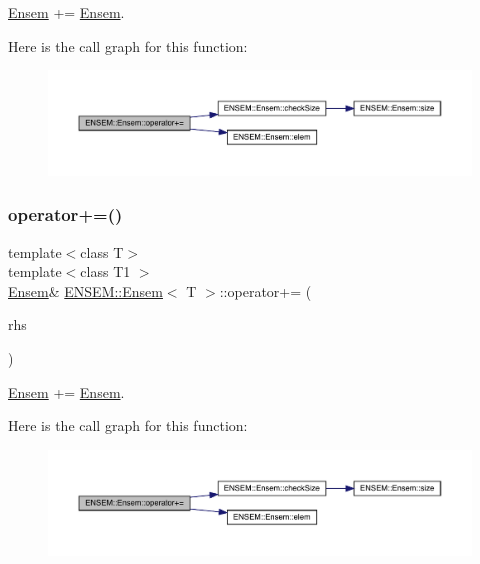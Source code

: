 \mbox{\hyperlink{classENSEM_1_1Ensem}{Ensem}} += \mbox{\hyperlink{classENSEM_1_1Ensem}{Ensem}}. 

Here is the call graph for this function\+:
\nopagebreak
\begin{figure}[H]
\begin{center}
\leavevmode
\includegraphics[width=350pt]{d7/d3e/classENSEM_1_1Ensem_ae24bd27a7f5a8ffed6ad4361956596fd_cgraph}
\end{center}
\end{figure}
\mbox{\label{classENSEM_1_1Ensem_ae24bd27a7f5a8ffed6ad4361956596fd}} 
\subsubsection{\texorpdfstring{operator+=()}{operator+=()}\hspace{0.1cm}{\footnotesize\ttfamily [5/6]}}
{\footnotesize\ttfamily template$<$class T$>$ \\
template$<$class T1 $>$ \\
\mbox{\hyperlink{classENSEM_1_1Ensem}{Ensem}}\& \mbox{\hyperlink{classENSEM_1_1Ensem}{E\+N\+S\+E\+M\+::\+Ensem}}$<$ T $>$\+::operator+= (\begin{DoxyParamCaption}\item[{const \mbox{\hyperlink{classENSEM_1_1Ensem}{Ensem}}$<$ T1 $>$ \&}]{rhs }\end{DoxyParamCaption})\hspace{0.3cm}{\ttfamily [inline]}}



\mbox{\hyperlink{classENSEM_1_1Ensem}{Ensem}} += \mbox{\hyperlink{classENSEM_1_1Ensem}{Ensem}}. 

Here is the call graph for this function\+:
\nopagebreak
\begin{figure}[H]
\begin{center}
\leavevmode
\includegraphics[width=350pt]{d7/d3e/classENSEM_1_1Ensem_ae24bd27a7f5a8ffed6ad4361956596fd_cgraph}
\end{center}
\end{figure}
\mbox{\label{classENSEM_1_1Ensem_ae24bd27a7f5a8ffed6ad4361956596fd}} 
